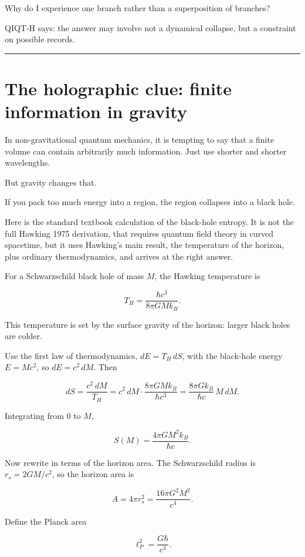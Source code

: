 \documentclass[11pt,a4paper]{article}
\newenvironment{qiqtquote}{\begin{mdframed}[style=quotestyle]}{\end{mdframed}}
\begin{document}
\begin{qiqtquote}
Why do I experience one branch rather than a superposition of branches?
\end{qiqtquote}

QIQT-H says: the answer may involve not a dynamical collapse, but a constraint on possible records.

\medskip\hrule\medskip

\section{The holographic clue: finite information in gravity}

In non-gravitational quantum mechanics, it is tempting to say that a finite volume can contain arbitrarily much information. Just use shorter and shorter wavelengths.

But gravity changes that.

If you pack too much energy into a region, the region collapses into a black hole.

Here is the standard textbook calculation of the black-hole entropy. It is not the full Hawking 1975 derivation, that requires quantum field theory in curved spacetime, but it uses Hawking's main result, the temperature of the horizon, plus ordinary thermodynamics, and arrives at the right answer.

For a Schwarzschild black hole of mass $M$, the Hawking temperature is

\[
T_H = \frac{\hbar c^3}{8\pi G M k_B}.
\]

This temperature is set by the surface gravity of the horizon: larger black holes are colder.

Use the first law of thermodynamics, $dE = T_H \, dS$, with the black-hole energy $E = M c^2$, so $dE = c^2 \, dM$. Then

\[
dS = \frac{c^2 \, dM}{T_H} = c^2 \, dM \cdot \frac{8\pi G M k_B}{\hbar c^3} = \frac{8\pi G k_B}{\hbar c} \, M \, dM.
\]

Integrating from $0$ to $M$,

\[
S(M) = \frac{4\pi G M^2 k_B}{\hbar c}.
\]

Now rewrite in terms of the horizon area. The Schwarzschild radius is $r_s = 2GM/c^2$, so the horizon area is

\[
A = 4\pi r_s^2 = \frac{16\pi G^2 M^2}{c^4}.
\]

Define the Planck area

\[
\ell_P^2 = \frac{G\hbar}{c^3}.
\]
\end{document}
